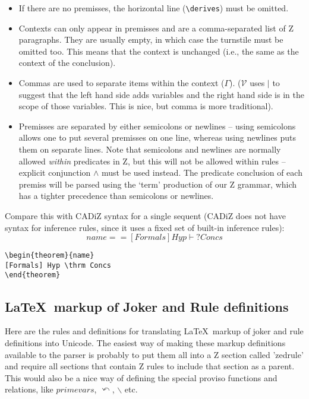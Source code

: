 \documentclass{article}
\newcommand{\V}{\mathcal{V}}
\newcommand{\derives}{\derive{}}
\newcommand{\Context}{\Gamma}
\newcommand{\notfreein}{\mathbin{\backslash}}
\newcommand{\substitute}{\mathrel{\curvearrowleft}}  %
\begin{document}
\begin{itemize}
\item 
  If there are no premisses, the horizontal line (\verb!\derives!)
  must be omitted.
\item Contexts can only appear in premisses and are a comma-separated
  list of Z paragraphs.  They are usually empty, in which case the
  turnstile must be omitted too.  This means that the context is
  unchanged (i.e., the same as the context of the conclusion).
\item Commas are used to separate items within the context ($\Context$).
  ($\V$ uses $|$ to suggest that the left hand side adds variables
  and the right hand side is in the scope of those variables.  This
  is nice, but comma is more traditional).
\item Premisses are separated by either semicolons or newlines
  -- using semicolons allows one to put several premisses on
  one line, whereas using newlines puts them on separate lines.
  Note that semicolons and newlines are normally allowed \emph{within}
  predicates in Z, but this will not be allowed within rules 
  -- explicit conjunction $\land$ must be used instead.  
  The predicate conclusion of each premiss 
  will be parsed using the `term' production of our Z grammar, which
  has a tighter precedence than semicolons or newlines.
\end{itemize}

Compare this with CADiZ syntax for a single sequent
(CADiZ does not have syntax for inference rules, since
it uses a fixed set of built-in inference rules):
\[ name == [Formals] Hyp \vdash? Concs \]
\begin{verbatim}
\begin{theorem}{name}
[Formals] Hyp \thrm Concs
\end{theorem}
\end{verbatim}


\subsection{\LaTeX\ markup of Joker and Rule definitions}

Here are the rules and definitions for translating \LaTeX\ markup
of joker and rule definitions into Unicode.  The easiest way
of making these markup definitions available to the parser is 
probably to put them all into a Z section called 'zedrule'
and require all sections that contain Z rules to include that
section as a parent.  This would also be a nice way of defining
the special proviso functions and relations, 
like $primevars$, $\substitute$, $\notfreein$ etc.
\end{document}

